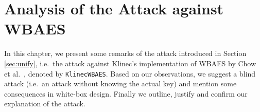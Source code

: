 \chapter{Analysis of the Attack against WBAES}
\label{chap:analysis}

In this chapter, we present some remarks of the attack introduced in Section \ref{sec:unify}, i.e.\ the attack against Klinec's implementation \cite{klinec2013implementation} of WBAES by Chow et al.\ \cite{chow2002aes}, denoted by {\tt KlinecWBAES}. Based on our observations, we suggest a blind attack (i.e.\ an attack without knowing the actual key) and mention some consequences in white-box design. %
Finally we outline, justify and confirm our explanation of the attack.








